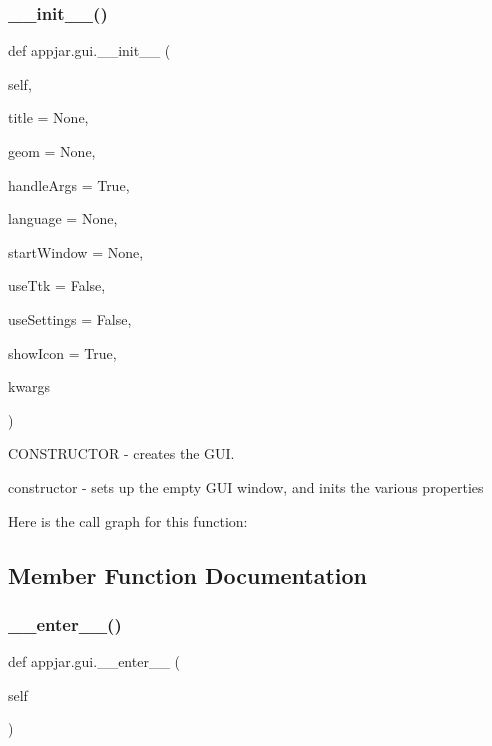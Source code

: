 \subsubsection{\texorpdfstring{\+\_\+\+\_\+init\+\_\+\+\_\+()}{\_\_init\_\_()}}
{\footnotesize\ttfamily def appjar.\+gui.\+\_\+\+\_\+init\+\_\+\+\_\+ (\begin{DoxyParamCaption}\item[{}]{self,  }\item[{}]{title = {\ttfamily None},  }\item[{}]{geom = {\ttfamily None},  }\item[{}]{handle\+Args = {\ttfamily True},  }\item[{}]{language = {\ttfamily None},  }\item[{}]{start\+Window = {\ttfamily None},  }\item[{}]{use\+Ttk = {\ttfamily False},  }\item[{}]{use\+Settings = {\ttfamily False},  }\item[{}]{show\+Icon = {\ttfamily True},  }\item[{}]{kwargs }\end{DoxyParamCaption})}



C\+O\+N\+S\+T\+R\+U\+C\+T\+OR -\/ creates the G\+UI. 

\begin{DoxyVerb}constructor - sets up the empty GUI window, and inits the various properties \end{DoxyVerb}
 Here is the call graph for this function\+:


\subsection{Member Function Documentation}
\mbox{\label{classappjar_1_1gui_a080c7b5f758b543e7c65e02040aa5f58}} 
\subsubsection{\texorpdfstring{\+\_\+\+\_\+enter\+\_\+\+\_\+()}{\_\_enter\_\_()}}
{\footnotesize\ttfamily def appjar.\+gui.\+\_\+\+\_\+enter\+\_\+\+\_\+ (\begin{DoxyParamCaption}\item[{}]{self }\end{DoxyParamCaption})}



